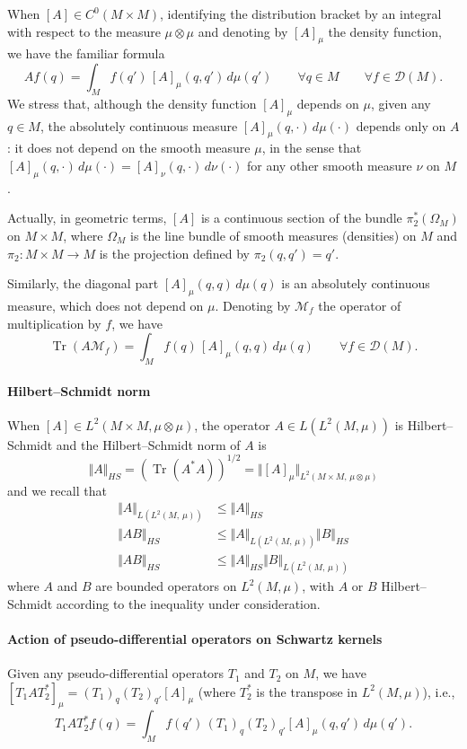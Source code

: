 \documentclass[10pt]{amsart}
\theoremstyle{definition}\newtheorem{defi}[theo]{Definition}\newtheorem{rema}[theo]{Remark}\newtheorem{exam}[theo]{Example}\newtheorem{exem}[theo]{Example}\newtheorem{nota}[theo]{Notation}
\newcommand{\calD}{\mathcal{D}}
\newcommand{\calM}{\mathcal{M}}
\DeclareMathOperator{\Tr}{Tr}
\renewcommand{\leq}{\leqslant}
\let\oldforall\forall
\renewcommand*{\forall}{\mathrel{\oldforall}}
\begin{document}
When $[A]\in C^0(M\times M)$, identifying the distribution bracket by an integral with respect to the measure $\mu\otimes\mu$ and denoting by $[A]_\mu$ the density function, we have the familiar formula
\[
Af(q) = \int_M f(q') \, [A]_\mu(q,q') \, d\mu(q') \qquad \forall q\in M\qquad \forall f\in\calD(M).
\]
We stress that, although the density function $[A]_\mu$ depends on $\mu$, given any $q\in M$, the absolutely continuous measure $[A]_\mu(q,\cdot)\, d\mu(\cdot)$ depends only on $A$: it does not depend on the smooth measure $\mu$, in the sense that $[A]_\mu(q,\cdot)\, d\mu(\cdot) = [A]_\nu(q,\cdot)\, d\nu(\cdot)$ for any other smooth measure $\nu$ on $M$.

Actually, in geometric terms, $[A]$ is a continuous section of the bundle $\pi_2^*(\Omega_M)$ on $M\times M$, where $\Omega_M$ is the line bundle of smooth measures (densities) on $M$ and $\pi_2:M\times M\rightarrow M$ is the projection defined by $\pi_2(q,q')=q'$.

Similarly, the diagonal part $[A]_\mu(q,q)\, d\mu(q)$ is an absolutely continuous measure, which does not depend on $\mu$. Denoting by $\calM_f$ the operator of multiplication by $f$, we have
\[
\Tr(A \calM_f) = \int_M f(q)\, [A]_\mu(q,q) \, d\mu(q) \qquad\forall f\in \calD(M).
\]

\goodbreak
\paragraph{Hilbert--Schmidt norm}
When $[A]\in L^2(M\times M,\mu\otimes\mu)$, the operator $A\in L(L^2(M,\mu))$ is Hilbert--Schmidt and the Hilbert--Schmidt norm of $A$ is
\[
\Vert A\Vert_{HS} = (\Tr(A^*A))^{1/2} = \Vert [A]_\mu\Vert_{L^2\left(M\times M,\,\mu\otimes\mu\right)}
\]
and we recall that
\begin{align*}
\Vert A\Vert_{L(L^2(M,\,\mu))} &\leq \Vert A\Vert_{HS} \\
\Vert AB\Vert_{HS} &\leq \Vert A\Vert_{L(L^2(M,\,\mu))} \Vert B\Vert_{HS} \\
\Vert AB\Vert_{HS} &\leq \Vert A\Vert_{HS} \Vert B\Vert_{L(L^2(M,\,\mu))}
\end{align*}
where $A$ and $B$ are bounded operators on $L^2(M,\mu)$, with $A$ or $B$ Hilbert--Schmidt according to the inequality under consideration.

\goodbreak
\paragraph{Action of pseudo-differential operators on Schwartz kernels}
Given any pseudo-differential operators $T_1$ and $T_2$ on $M$, we have $[T_1AT_2^*]_\mu = (T_1)_q (T_2)_{q'}[A]_\mu$ (where $T_2^*$ is the transpose in $L^2(M,\mu)$), i.e.,
\[
T_1AT_2^* f(q) = \int_M f(q')\, (T_1)_q (T_2)_{q'}[A]_\mu (q,q') \, d\mu(q').
\]
\end{document}
